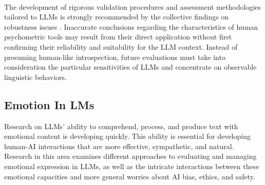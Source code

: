 \documentclass{DESSThesis}
\begin{document}
\\
The development of rigorous validation procedures and assessment methodologies tailored to LLMs is strongly recommended by the collective findings on robustness issues \cite{gupta_self-assessment_2024,shu_you_2024,suhr_challenging_2023,zheng_lmlpa_2024}. Inaccurate conclusions regarding the characteristics of human psychometric tools may result from their direct application without first confirming their reliability and suitability for the LLM context. Instead of presuming human-like introspection, future evaluations must take into consideration the particular sensitivities of LLMs and concentrate on observable linguistic behaviors.

\subsection{Emotion In LMs}
Research on LLMs' ability to comprehend, process, and produce text with emotional content is developing quickly. This ability is essential for developing human-AI interactions that are more effective, sympathetic, and natural. Research in this area examines different approaches to evaluating and managing emotional expression in LLMs, as well as the intricate interactions between these emotional capacities and more general worries about AI bias, ethics, and safety.
\end{document}
